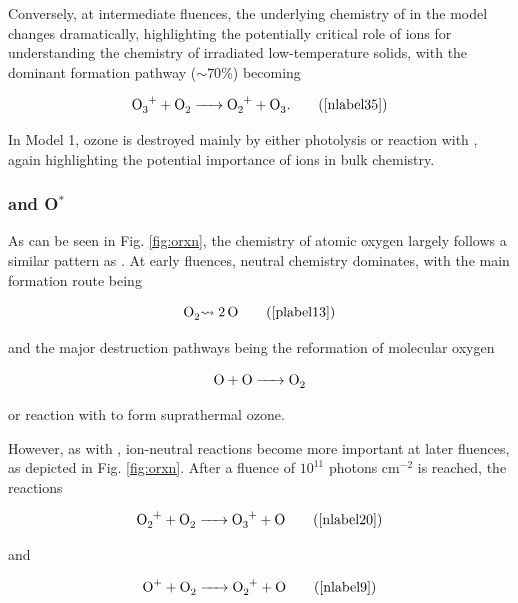 \documentclass[journal=aesccq,manuscript=article,layout=twocolumn]{achemso}
\begin{document}
Conversely, at intermediate fluences, the underlying chemistry of  in the model changes dramatically, highlighting the potentially critical role of ions for understanding the chemistry of irradiated low-temperature solids, with the dominant formation pathway ($\sim70$\%) becoming

\begin{equation}
    \ce{O3+ + O2 -> O2+ + O3}.
    \tag{\ref{nlabel35}}
\end{equation}

In Model 1, ozone is destroyed mainly by either photolysis or reaction with , again highlighting the potential importance of ions in bulk chemistry. 


\subsubsection{ and O$^*$}


As can be seen in Fig. \ref{fig:orxn}, the chemistry of atomic oxygen largely follows a similar pattern as . At early fluences, neutral chemistry dominates, with the main formation route being

\begin{equation}
    \ce{O2 \leadsto{} 2O}
    \tag{\ref{plabel13}}
    \label{oformation}
\end{equation}

\noindent
and the major destruction pathways being the reformation of molecular oxygen

\begin{equation}
    \ce{O + O -> O2}
    \label{odestruction}
\end{equation}

\noindent
or reaction with  to form suprathermal ozone.

However, as with , ion-neutral reactions become more important at later fluences, as depicted in Fig. \ref{fig:orxn}. After a fluence of $10^{11}$ photons cm$^{-2}$ is reached, the reactions

\begin{equation}
    \ce{O2+ + O2 -> O3+ + O}
    \tag{\ref{nlabel20}}
    \label{otwoiondest}
\end{equation}

\noindent
and

\begin{equation}
    \ce{O+ + O2 -> O2+ + O}
    \tag{\ref{nlabel9}}
\end{equation}
\end{document}
